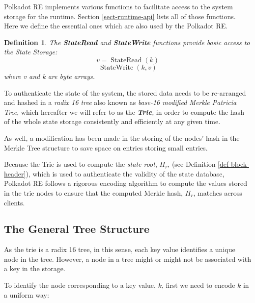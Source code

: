 \documentclass{article}
\newcommand{\tmem}[1]{{\em #1\/}}
\newcommand{\tmop}[1]{\ensuremath{\operatorname{#1}}}
\newcommand{\tmstrong}[1]{\textbf{#1}}
\newcommand{\tmtextbf}[1]{{\bfseries{#1}}}
\newcommand{\tmtextit}[1]{{\itshape{#1}}}
\newtheorem{definition}{Definition}
\providecommand{\tmem}[1]{\tmtextit{#1}}
\providecommand{\tmop}[1]{\ensuremath{\mathrm{#1}}}
\providecommand{\tmstrong}[1]{\tmtextbf{#1}}
\providecommand{\tmtextbf}[1]{\tmtextbf{#1}}
\providecommand{\tmtextit}[1]{\tmtextit{#1}}
\newtheorem{definition}{Definition}
\begin{document}
Polkadot RE implements various functions to facilitate access to the system
storage for the runtime. Section \ref{sect-runtime-api} lists all of those
functions. Here we define the essential ones which are also used by the
Polkadot RE.

\begin{definition}
  \label{def-state-read-write}The {\tmstrong{StateRead}} and
  {\tmstrong{StateWrite}} functions provide basic access to the State Storage:
  \[ v = \tmop{StateRead} (k) \]
  \[ \tmop{StateWrite} (k, v) \]
  where v and k are byte arrays.
\end{definition}

To authenticate the state of the system, the stored data needs to be
re-arranged and hashed in a {\tmem{radix 16 tree}} also known as
{\tmem{base-16 modified Merkle Patricia Tree}}, which hereafter we will refer
to as the {\tmem{{\tmstrong{Trie}},}} in order to compute the hash of the
whole state storage consistently and efficiently at any given time.

As well, a modification has been made in the storing of the nodes' hash in the
Merkle Tree structure to save space on entries storing small entries.

Because the Trie is used to compute the {\tmem{state root}}, $H_r$, (see
Definition \ref{def-block-header}), which is used to authenticate the validity
of the state database, Polkadot RE follows a rigorous encoding algorithm to
compute the values stored in the trie nodes to ensure that the computed Merkle
hash, $H_r$, matches across clients.

\subsection{The General Tree Structure}

As the trie is a radix 16 tree, in this sense, each key value identifies a
unique node in the tree. However, a node in a tree might or might not be
associated with a key in the storage.

To identify the node corresponding to a key value, $k$, first we need to
encode $k$ in a uniform way:
\end{document}
